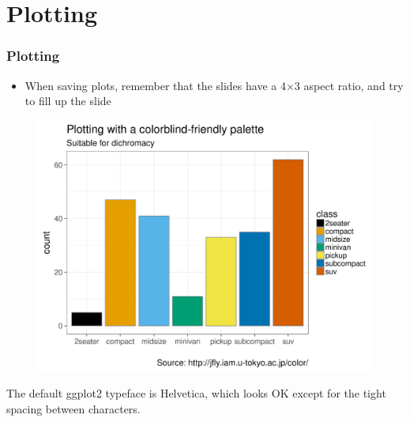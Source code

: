 
\section{Plotting}
\label{sec:plotting}


\begin{frame}
  \frametitle{Plotting}

  \begin{itemize}
  \item When saving plots, remember that the slides have a 4$\times$3
    aspect ratio, and try to fill up the slide
  \end{itemize}
  
\end{frame}


\begin{frame}
  \begin{figure}[htp!]
    \centering
    \includegraphics[width=0.9\linewidth]{fig/barchart-defaultfont.png}
  \end{figure}

  \small The default ggplot2 typeface is Helvetica, which looks OK
  except for the tight spacing between characters.
  
\end{frame}



